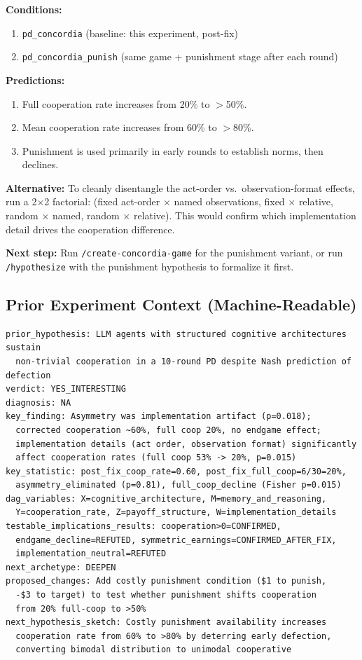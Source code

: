 \documentclass[11pt]{article}
\begin{document}
\textbf{Conditions:}
\begin{enumerate}
\item \texttt{pd\_concordia} (baseline: this experiment, post-fix)
\item \texttt{pd\_concordia\_punish} (same game + punishment stage after each round)
\end{enumerate}

\textbf{Predictions:}
\begin{enumerate}
\item Full cooperation rate increases from 20\% to $>$50\%.
\item Mean cooperation rate increases from 60\% to $>$80\%.
\item Punishment is used primarily in early rounds to establish norms, then declines.
\end{enumerate}

\textbf{Alternative:} To cleanly disentangle the act-order vs.\ observation-format effects, run a 2$\times$2 factorial: (fixed act-order $\times$ named observations, fixed $\times$ relative, random $\times$ named, random $\times$ relative). This would confirm which implementation detail drives the cooperation difference.

\textbf{Next step:} Run \texttt{/create-concordia-game} for the punishment variant, or run \texttt{/hypothesize} with the punishment hypothesis to formalize it first.

\subsection*{Prior Experiment Context (Machine-Readable)}
\begin{verbatim}
prior_hypothesis: LLM agents with structured cognitive architectures sustain
  non-trivial cooperation in a 10-round PD despite Nash prediction of defection
verdict: YES_INTERESTING
diagnosis: NA
key_finding: Asymmetry was implementation artifact (p=0.018);
  corrected cooperation ~60%, full coop 20%, no endgame effect;
  implementation details (act order, observation format) significantly
  affect cooperation rates (full coop 53% -> 20%, p=0.015)
key_statistic: post_fix_coop_rate=0.60, post_fix_full_coop=6/30=20%,
  asymmetry_eliminated (p=0.81), full_coop_decline (Fisher p=0.015)
dag_variables: X=cognitive_architecture, M=memory_and_reasoning,
  Y=cooperation_rate, Z=payoff_structure, W=implementation_details
testable_implications_results: cooperation>0=CONFIRMED,
  endgame_decline=REFUTED, symmetric_earnings=CONFIRMED_AFTER_FIX,
  implementation_neutral=REFUTED
next_archetype: DEEPEN
proposed_changes: Add costly punishment condition ($1 to punish,
  -$3 to target) to test whether punishment shifts cooperation
  from 20% full-coop to >50%
next_hypothesis_sketch: Costly punishment availability increases
  cooperation rate from 60% to >80% by deterring early defection,
  converting bimodal distribution to unimodal cooperative
\end{verbatim}
\end{document}
